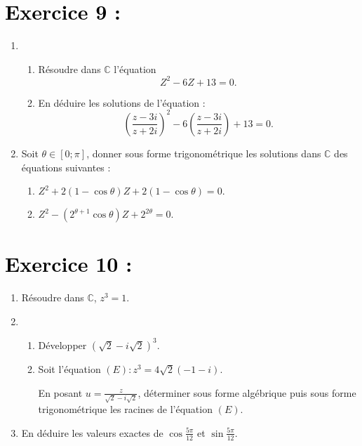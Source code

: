 \documentclass[12pt]{article}
\begin{document}
\section*{\textcolor{black}{Exercice 9 :}}

\begin{enumerate}
    \item
    \begin{enumerate}
        \item Résoudre dans $\mathbb{C}$ l'équation 
        \[
        Z^2 - 6Z + 13 = 0.
        \]

        \item En déduire les solutions de l'équation :
        \[
        \left( \frac{z - 3i}{z + 2i} \right)^2 - 6 \left( \frac{z - 3i}{z + 2i} \right) + 13 = 0.
        \]
    \end{enumerate}

    \item Soit $\theta \in [0; \pi]$, donner sous forme trigonométrique les solutions dans $\mathbb{C}$ des équations suivantes :
    \begin{enumerate}
        \item $Z^2 + 2(1 - \cos \theta)Z + 2(1 - \cos \theta) = 0.$
        \item $Z^2 - (2^{\theta+1} \cos \theta)Z + 2^{2\theta} = 0.$
    \end{enumerate}
\end{enumerate}

\section*{\textcolor{black}{Exercice 10 :}}

\begin{enumerate}
    \item Résoudre dans $\mathbb{C}$, $z^3 = 1$.

    \item
    \begin{enumerate}
        \item Développer $(\sqrt{2} - i\sqrt{2})^3$.

        \item Soit l'équation $(E) : z^3 = 4\sqrt{2}(-1 - i)$.

        En posant $u = \frac{z}{\sqrt{2} - i\sqrt{2}}$, déterminer sous forme algébrique puis sous forme trigonométrique les racines de l'équation $(E)$.
    \end{enumerate}

    \item En déduire les valeurs exactes de $\cos\frac{5\pi}{12}$ et $\sin\frac{5\pi}{12}$.
\end{enumerate}
\end{document}
